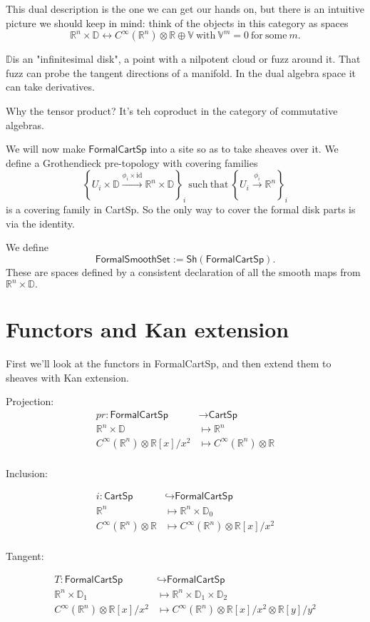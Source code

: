 \documentclass[12pt]{article}
\newcommand{\rr}{\ensuremath{\mathbb{R}}}
\newcommand{\rrn}{\ensuremath{\mathbb{R}^n}}
\newcommand{\rrx}{\ensuremath{\mathbb{R}[x]/x^2}}
\newcommand{\rry}{\ensuremath{\mathbb{R}[y]/y^2}}
\newcommand{\dd}{\ensuremath{\mathbb{D}}}
\newcommand{\cinfty}{\ensuremath{C^{\infty}}}
\newcommand{\cart}{\textsf{CartSp}}
\newcommand{\formalcart}{\textsf{FormalCartSp}}
\newcommand{\formalsmoothset}{\textsf{FormalSmoothSet}}
\newcommand{\sh}[1]{\textsf{Sh}(#1)}
\begin{document}
This dual description is the one we can get our hands on, but there is an intuitive picture we should keep in mind: think of the objects in this category as spaces $$\rr^n\times\dd\leftrightarrow\cinfty(\rr^n)\otimes\rr\oplus\mathbb{V}\mathrm{\ with\ }\mathbb{V}^m=0\mathrm{\ for\ some\ }m.$$

\dd is an "infinitesimal disk", a point with a nilpotent cloud or fuzz around it. That fuzz can probe the tangent directions of a manifold. In the dual algebra space it can take derivatives.

Why the tensor product? It's teh coproduct in the category of commutative algebras.

We will now make $\formalcart$ into a site so as to take sheaves over it. We define a Grothendieck pre-topology with covering families $$\left\{U_i\times\dd\xrightarrow[]{\phi_i\times\mathrm{id}}\rr^n\times\dd\right\}_i\mathrm{\ such\ that\ }\left\{U_i\xrightarrow[]{\phi_i}\rr^n\right\}_i$$
is a covering family in \cart. So the only way to cover the formal disk parts is via the identity.

We define $$\formalsmoothset:=\sh{\formalcart}.$$ These are spaces defined by a consistent declaration of all the smooth maps from $\rr^n\times\dd.$

\section{Functors and Kan extension}\label{sec:functors}
First we'll look at the functors in \formalcart, and then extend them to sheaves with Kan extension.

Projection:
\begin{align*}
pr:\formalcart &\to\cart \\
\rr^n\times\dd &\mapsto \rr^n \\
\cinfty(\rrn)\otimes\rrx &\mapsto \cinfty(\rrn)\otimes\rr \\
\end{align*}

Inclusion:

\begin{align*}
i:\cart &\hookrightarrow\formalcart \\
\rrn &\mapsto \rrn\times\dd_0 \\
\cinfty(\rrn)\otimes\rr &\mapsto\cinfty(\rrn)\otimes\rrx \\
\end{align*}

Tangent:

\begin{align*}
T:\formalcart &\hookrightarrow\formalcart \\
\rrn\times\dd_1 &\mapsto \rrn\times\dd_1\times\dd_2 \\
\cinfty(\rrn)\otimes\rrx &\mapsto\cinfty(\rrn)\otimes\rrx\otimes\rry \\
\end{align*}
\end{document}
